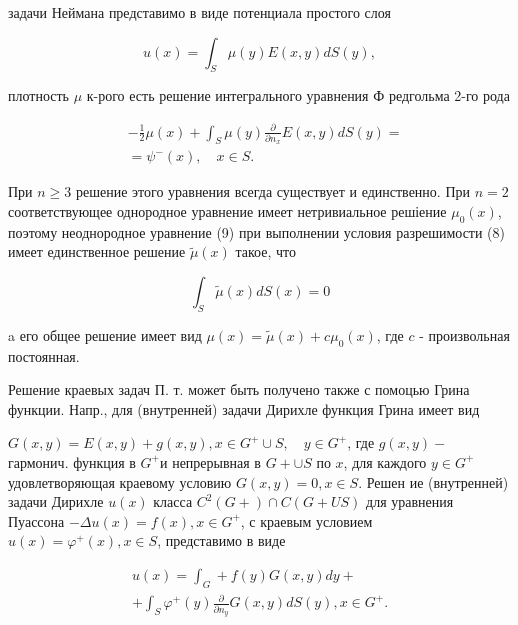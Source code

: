 \documentclass[10pt]{article}
\begin{document}
задачи Неймана представимо в виде потенциала простого слоя



\[

u(x)=\int_{S} \mu(y) E(x, y) d S(y),

\]



плотность $\mu$ к-рого есть решение интегрального уравнения Ф редгольма 2-го рода



\[

\begin{aligned}

& -\frac{1}{2} \mu(x)+\int_{S} \mu(y) \frac{\partial}{\partial n_{x}} E(x, y) d S(y)= \\

& =\psi^{-}(x), \quad x \in S \text {. }

\end{aligned}

\]



При $n \geqslant 3$ решение этого уравнения всегда существует и единственно. При $n=2$ соответствующее однородное уравнение имеет нетривиальное решіение $\mu_{0}(x)$, поэтому неоднородное уравнение (9) при выполнении условия разрешимости (8) имеет единственное решение $\tilde{\mu}(x)$ такое, что



\[

\int_{S} \tilde{\mu}(x) d S(x)=0

\]



a его общее решение имеет вид $\mu(x)=\tilde{\mu}(x)+c \mu_{0}(x)$, где $c$ - произвольная постоянная.



Решение краевых задач П. т. может быть получено также с помоцью Грина функции. Напр., для (внутренней) задачи Дирихле функция Грина имеет вид



$G(x, y)=E(x, y)+g(x, y), x \in G^{+} \cup S, \quad y \in G^{+}$, где $g(x, y)-$ гармонич. функция в $G^{+}$и непрерывная в $G+\cup S$ по $x$, для каждого $y \in G^{+}$удовлетворяющая краевому условию $G(x, y)=0, x \in S$. Решен ие (внутренней) задачи Дирихле $u(x)$ класса $C^{2}(G+) \cap C(G+U S)$ для уравнения Пуассона $-\Delta u(x)=f(x), x \in G^{+}$, с краевым условием $u(x)=\varphi^{+}(x), x \in S$, представимо в виде



\[

\begin{gathered}

u(x)=\int_{G}+f(y) G(x, y) d y+ \\

+\int_{S} \varphi^{+}(y) \frac{\partial}{\partial n_{y}} G(x, y) d S(y), x \in G^{+} .

\end{gathered}

\]
\end{document}
